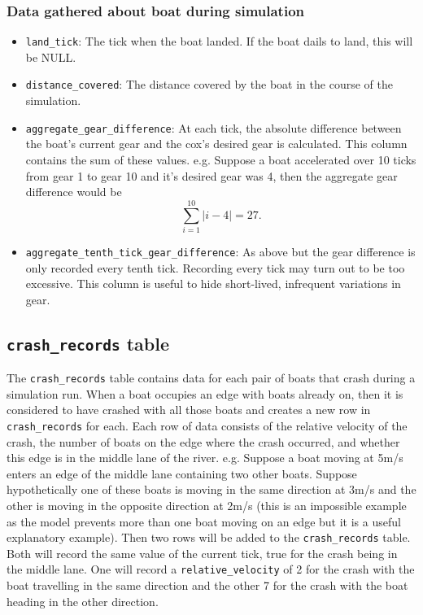{\subsubsection{Data gathered about boat during simulation}
\begin{itemize}
  \item{\texttt{land\_tick}:} The tick when the boat landed. If the boat dails
    to land, this will be NULL.
  \item{\texttt{distance\_covered}:} The distance covered by the boat in the
    course of the simulation.
  \item{\texttt{aggregate\_gear\_difference}:} At each tick, the absolute
    difference between the boat's current gear and the cox's desired
    gear is calculated. This column contains the sum of these values. e.g. Suppose a boat accelerated over 10 ticks from gear 1 to gear 10 and it's desired gear was 4, then the aggregate gear difference would be 
    \[\sum_{i=1}^{10} |i - 4| = 27.\]
  \item{\texttt{aggregate\_tenth\_tick\_gear\_difference}:} As above but the
    gear difference is only recorded every tenth tick. Recording every
    tick may turn out to be too excessive. This column is useful to
    hide short-lived, infrequent variations in gear.
\end{itemize}

\subsection{\texttt{crash\_records} table}

The \texttt{crash\_records} table contains data for each pair of boats that crash during a simulation run. When a boat occupies an edge with boats already on, then it is considered to have crashed with all those boats and creates a new row in \texttt{crash\_records} for each. Each row of data consists of the relative velocity of the crash, the number of boats on the edge where the crash occurred, and whether this edge is in the middle lane of the river. e.g. Suppose a boat moving at 5m/s enters an edge of the middle lane containing two other boats. Suppose hypothetically one of these boats is moving in the same direction at 3m/s and the other is moving in the opposite direction at 2m/s (this is an impossible example as the model prevents more than one boat moving on an edge but it is a useful explanatory example). Then two rows will be added to the \texttt{crash\_records} table. Both will record the same value of the current tick, true for the crash being in the middle lane. One will record a \texttt{relative\_velocity} of 2 for the crash with the boat travelling in the same direction and the other 7 for the crash with the boat heading in the other direction.

}
